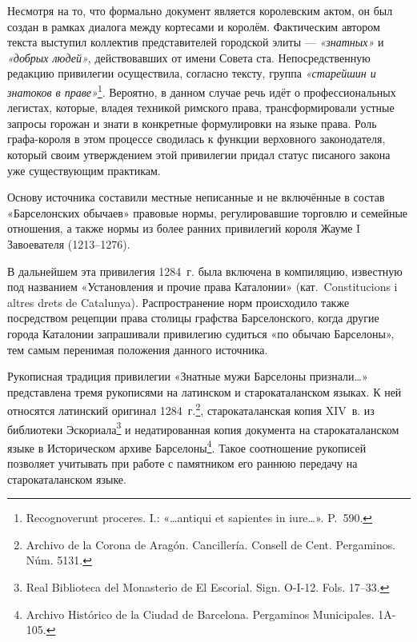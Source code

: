 Несмотря на то, что формально документ является королевским актом, он был создан в рамках диалога между кортесами и королём. Фактическим автором текста выступил коллектив представителей городской элиты --- \emph{«знатных»} и \emph{«добрых людей»}, действовавших от имени Совета ста. Непосредственную редакцию привилегии осуществила, согласно тексту, группа \emph{«старейшин и знатоков в праве»}\footnote{Recognoverunt proceres. I.: «…antiqui et sapientes in iure…». P.~590.}. Вероятно, в данном случае речь идёт о профессиональных легистах, которые, владея техникой римского права, трансформировали устные запросы горожан и знати в конкретные формулировки на языке права. Роль графа-короля в этом процессе сводилась к функции верховного законодателя, который своим утверждением этой привилегии придал статус писаного закона уже существующим практикам.

Основу источника составили местные неписанные и не включённые в состав «Барселонских обычаев» правовые нормы, регулировавшие торговлю и семейные отношения, а также нормы из более ранних привилегий короля Жауме I Завоевателя (1213--1276).

В дальнейшем эта привилегия 1284~г. была включена в компиляцию, известную под названием «Установления и прочие права Каталонии» (кат.~Constitucions i altres drets de Catalunya). Распространение норм происходило также посредством рецепции права столицы графства Барселонского, когда другие города Каталонии запрашивали привилегию судиться «по обычаю Барселоны», тем самым перенимая положения данного источника.

Рукописная традиция привилегии «Знатные мужи Барселоны признали…» представлена тремя рукописями на латинском и старокаталанском языках. К ней относятся латинский оригинал 1284~г.\footnote{Archivo de la Corona de Aragón. Cancillería. Consell de Cent. Pergaminos. Núm. 5131.}, старокаталанская копия XIV~в. из библиотеки Эскориала\footnote{Real Biblioteca del Monasterio de El Escorial. Sign. O-I-12. Fols. 17--33.} и недатированная копия документа на старокаталанском языке в Историческом архиве Барселоны\footnote{Archivo Histórico de la Ciudad de Barcelona. Pergaminos Municipales. 1A-105.}. Такое соотношение рукописей позволяет учитывать при работе с памятником его раннюю передачу на старокаталанском языке.

